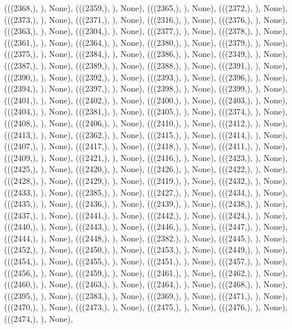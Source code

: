  (((2368,), {}), None),
 (((2359,), {}), None),
 (((2365,), {}), None),
 (((2372,), {}), None),
 (((2373,), {}), None),
 (((2371,), {}), None),
 (((2316,), {}), None),
 (((2376,), {}), None),
 (((2363,), {}), None),
 (((2304,), {}), None),
 (((2377,), {}), None),
 (((2378,), {}), None),
 (((2361,), {}), None),
 (((2364,), {}), None),
 (((2380,), {}), None),
 (((2379,), {}), None),
 (((2375,), {}), None),
 (((2384,), {}), None),
 (((2386,), {}), None),
 (((2349,), {}), None),
 (((2387,), {}), None),
 (((2389,), {}), None),
 (((2388,), {}), None),
 (((2391,), {}), None),
 (((2390,), {}), None),
 (((2392,), {}), None),
 (((2393,), {}), None),
 (((2396,), {}), None),
 (((2394,), {}), None),
 (((2397,), {}), None),
 (((2398,), {}), None),
 (((2399,), {}), None),
 (((2401,), {}), None),
 (((2402,), {}), None),
 (((2400,), {}), None),
 (((2403,), {}), None),
 (((2404,), {}), None),
 (((2381,), {}), None),
 (((2405,), {}), None),
 (((2374,), {}), None),
 (((2408,), {}), None),
 (((2406,), {}), None),
 (((2410,), {}), None),
 (((2412,), {}), None),
 (((2413,), {}), None),
 (((2362,), {}), None),
 (((2415,), {}), None),
 (((2414,), {}), None),
 (((2407,), {}), None),
 (((2417,), {}), None),
 (((2418,), {}), None),
 (((2411,), {}), None),
 (((2409,), {}), None),
 (((2421,), {}), None),
 (((2416,), {}), None),
 (((2423,), {}), None),
 (((2425,), {}), None),
 (((2420,), {}), None),
 (((2426,), {}), None),
 (((2422,), {}), None),
 (((2428,), {}), None),
 (((2429,), {}), None),
 (((2419,), {}), None),
 (((2432,), {}), None),
 (((2433,), {}), None),
 (((2385,), {}), None),
 (((2427,), {}), None),
 (((2434,), {}), None),
 (((2435,), {}), None),
 (((2436,), {}), None),
 (((2439,), {}), None),
 (((2438,), {}), None),
 (((2437,), {}), None),
 (((2441,), {}), None),
 (((2442,), {}), None),
 (((2424,), {}), None),
 (((2440,), {}), None),
 (((2443,), {}), None),
 (((2446,), {}), None),
 (((2447,), {}), None),
 (((2444,), {}), None),
 (((2448,), {}), None),
 (((2382,), {}), None),
 (((2445,), {}), None),
 (((2452,), {}), None),
 (((2450,), {}), None),
 (((2453,), {}), None),
 (((2449,), {}), None),
 (((2454,), {}), None),
 (((2455,), {}), None),
 (((2451,), {}), None),
 (((2457,), {}), None),
 (((2456,), {}), None),
 (((2459,), {}), None),
 (((2461,), {}), None),
 (((2462,), {}), None),
 (((2460,), {}), None),
 (((2463,), {}), None),
 (((2464,), {}), None),
 (((2468,), {}), None),
 (((2395,), {}), None),
 (((2383,), {}), None),
 (((2369,), {}), None),
 (((2471,), {}), None),
 (((2470,), {}), None),
 (((2473,), {}), None),
 (((2475,), {}), None),
 (((2476,), {}), None),
 (((2474,), {}), None),
